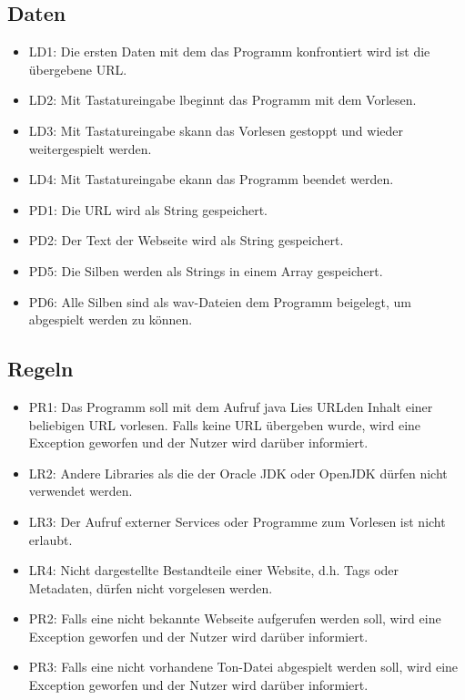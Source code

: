 \documentclass[12pt]{scrartcl}
\begin{document}
\newpage

\subsection{Daten}
\begin{itemize}
	\item LD1: Die ersten Daten mit dem das Programm konfrontiert wird ist die übergebene URL.
	\item LD2: Mit Tastatureingabe \glqq l\grqq beginnt das Programm mit dem Vorlesen.
	\item LD3: Mit Tastatureingabe \glqq s\grqq kann das Vorlesen gestoppt und wieder weitergespielt werden.
	\item LD4: Mit Tastatureingabe \glqq e\grqq kann das Programm beendet werden.
	\item PD1: Die URL wird als String gespeichert.
	\item PD2: Der Text der Webseite wird als String gespeichert.
	\item PD5: Die Silben werden als Strings in einem Array gespeichert.
	\item PD6: Alle Silben sind als wav-Dateien dem Programm beigelegt, um abgespielt werden zu können.
\end{itemize}


\subsection{Regeln}

\begin{itemize}
	\item PR1: Das Programm soll mit dem Aufruf java Lies \glqq URL\grqq den Inhalt einer beliebigen URL vorlesen. Falls keine URL übergeben wurde, wird eine Exception geworfen und der Nutzer wird darüber informiert.
	\item LR2: Andere Libraries als die der Oracle JDK oder OpenJDK dürfen nicht verwendet werden.
	\item LR3: Der Aufruf externer Services oder Programme zum Vorlesen ist nicht erlaubt.
	\item LR4: Nicht dargestellte Bestandteile einer Website, d.h. Tags oder Metadaten, dürfen nicht vorgelesen werden.
	\item PR2: Falls eine nicht bekannte Webseite aufgerufen werden soll, wird eine Exception geworfen und der Nutzer wird darüber informiert.
	\item PR3: Falls eine nicht vorhandene Ton-Datei abgespielt werden soll, wird eine Exception geworfen und der Nutzer wird darüber informiert.
\end{itemize}
\end{document}
